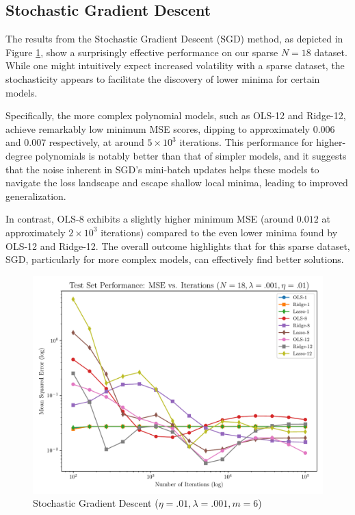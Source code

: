 \documentclass[twocolumn,aps]{revtex4}
\begin{document}
\subsection{Stochastic Gradient Descent}
The results from the Stochastic Gradient Descent (SGD) method, as depicted in Figure \ref{fig:GradSGD}, show a surprisingly effective performance on our sparse $N=18$ dataset. 
While one might intuitively expect increased volatility with a sparse dataset, the stochasticity appears to facilitate the discovery of lower minima for certain models.

Specifically, the more complex polynomial models, such as OLS-12 and Ridge-12, achieve remarkably low minimum MSE scores, dipping to approximately $0.006$ and $0.007$ respectively, at around $5 \times 10^3$ iterations. 
This performance for higher-degree polynomials is notably better than that of simpler models, and it suggests that the noise inherent in SGD's mini-batch updates helps these models to navigate the loss landscape and escape shallow local minima, leading to improved generalization.

In contrast, OLS-8 exhibits a slightly higher minimum MSE (around $0.012$ at approximately $2 \times 10^3$ iterations) compared to the even lower minima found by OLS-12 and Ridge-12. 
The overall outcome highlights that for this sparse dataset, SGD, particularly for more complex models, can effectively find better solutions.


\begin{figure}[h]
    \centering
    \includegraphics[width=.95 \linewidth]{Figures/StochasticDescent.pdf}
    \caption{Stochastic Gradient Descent ($\eta=.01, \lambda=.001, m=6$)}
    \label{fig:GradSGD}
\end{figure}
\end{document}
